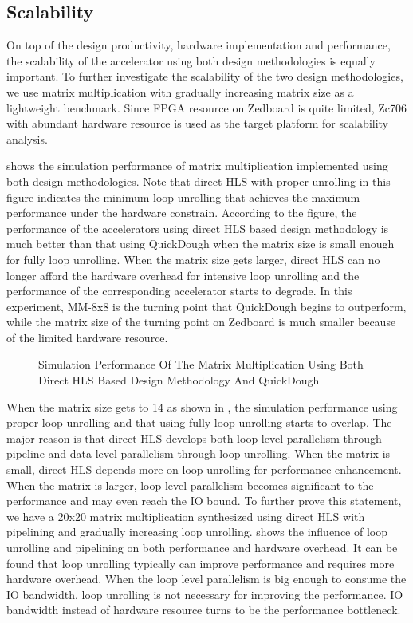   
\subsection{Scalability}
On top of the design productivity, hardware implementation and performance, the scalability of the accelerator using both design methodologies is equally important. To further investigate the scalability of the two design methodologies, we use matrix multiplication with gradually increasing matrix size as a lightweight benchmark. Since FPGA resource on Zedboard is quite limited, Zc706 with abundant hardware resource is used as the target platform for scalability analysis. 

 shows the simulation performance of matrix multiplication implemented using both design methodologies. Note that direct HLS with proper unrolling in this figure indicates the minimum loop unrolling that achieves the maximum performance under the hardware constrain. According to the figure, the performance of the accelerators using direct HLS based design methodology is much better than that using QuickDough when the matrix size is small enough for fully loop unrolling. When the matrix size gets larger, direct HLS can no longer afford the hardware overhead for intensive loop unrolling and the performance of the corresponding accelerator starts to degrade. In this experiment, MM-8x8 is the turning point that QuickDough begins to outperform, while the matrix size of the turning point on Zedboard is much smaller because of the limited hardware resource.

\begin{figure}[htpb]
\centering
{}
\qquad
{}
\caption{Simulation Performance Of The Matrix Multiplication Using Both Direct HLS Based Design Methodology And QuickDough}
\label{fig:mm-sim-perf}
\end{figure}


When the matrix size gets to 14 as shown in , the simulation performance using proper loop unrolling and that using fully loop unrolling starts to overlap. The major reason is that direct HLS develops both loop level parallelism through pipeline and data level parallelism through loop unrolling. When the matrix is small, direct HLS depends more on loop unrolling for performance enhancement. When the matrix is larger, loop level parallelism becomes significant to the performance and may even reach the IO bound. To further prove this statement, we have a 20x20 matrix multiplication synthesized using direct HLS with pipelining and gradually increasing loop unrolling.  shows the influence of loop unrolling and pipelining on both performance and hardware overhead. It can be found that loop unrolling typically can improve performance and requires more hardware overhead. When the loop level parallelism is big enough to consume the IO bandwidth, loop unrolling is not necessary for improving the performance. IO bandwidth instead of hardware resource turns to be the performance bottleneck. 

